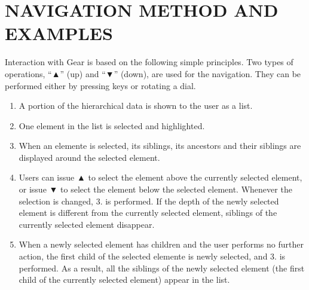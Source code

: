 \documentclass{article}
\def\up{▲}
\def\down{▼}
\begin{document}

\section*{NAVIGATION METHOD AND EXAMPLES}
\label{navigation}

Interaction with Gear is based on the following simple principles.
Two types of operations,
``{\up}'' (up) and ``{\down}'' (down), are used for the navigation.
They can be performed either by pressing keys or rotating a dial.

\begin{enumerate}
\item A portion of the hierarchical data is shown to the user as a list.

\item One element in the list is selected and highlighted.


\item When an elemente is selected, its siblings, its ancestors and their siblings are displayed
around the selected element.

\item Users can issue {\up} to select the element above the currently selected element,
or issue {\down} to select the element below the selected element.
Whenever the selection is changed, 3. is performed.
If the depth of the newly selected element is different from the currently
selected element, siblings of the currently selected element disappear.

\item When a newly selected element has children and the user performs no further action,
the first child of the selected elemente is newly selected, and 3. is performed.
As a result, all the siblings of the newly selected element
(the first child of the currently selected element) appear in the list.

\end{enumerate}
\end{document}
